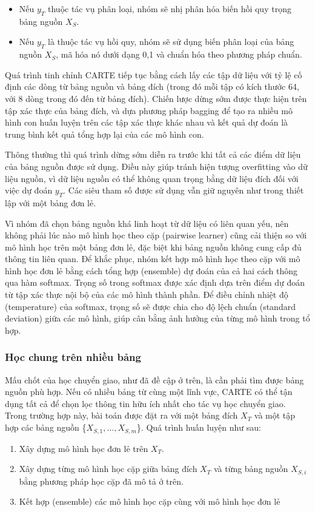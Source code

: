 \documentclass{article}
\begin{document}
\begin{itemize}
    \item Nếu $y_T$ thuộc tác vụ phân loại, nhóm sẽ nhị phân hóa biến hồi quy trọng bảng nguồn $X_S$.
    \item Nếu $y_T$ là thuộc tác vụ hồi quy, nhóm sẽ sử dụng biến phân loại của bảng nguồn $X_S$, mã hóa nó dưới dạng {0,1} và chuẩn hóa theo phương pháp chuẩn.
\end{itemize}

Quá trình tinh chỉnh CARTE tiếp tục bằng cách lấy các tập dữ liệu với tỷ lệ cố định các dòng từ bảng nguồn và bảng đích (trong đó mỗi tập có kích thước 64, với 8 dòng trong đó đến từ bảng đích). Chiến lược dừng sớm được thực hiện trên tập xác thực của bảng đích, và dựa phương pháp bagging để tạo ra nhiều mô hình con huấn luyện trên các tập xác thực khác nhau và kết quả dự đoán là trung bình kết quả tổng hợp lại của các mô hình con.

Thông thường thì quá trình dừng sớm diễn ra trước khi tất cả các điểm dữ liệu của bảng nguồn được sử dụng. Điều này giúp tránh hiện tượng overfitting vào dữ liệu nguồn, vì dữ liệu nguồn có thể không quan trọng bằng dữ liệu đích đối với việc dự đoán $y_T$. Các siêu tham số được sử dụng vẫn giữ nguyên như trong thiết lập với một bảng đơn lẻ.

Vì nhóm đã chọn bảng nguồn khá linh hoạt từ dữ liệu có liên quan yếu, nên không phải lúc nào mô hình học theo cặp (pairwise learner) cũng cải thiện so với mô hình học trên một bảng đơn lẻ, đặc biệt khi bảng nguồn không cung cấp đủ thông tin liên quan. Để khắc phục, nhóm kết hợp mô hình học theo cặp với mô hình học đơn lẻ bằng cách tổng hợp (ensemble) dự đoán của cả hai cách thông qua hàm softmax. Trọng số trong softmax được xác định dựa trên điểm dự đoán từ tập xác thực nội bộ của các mô hình thành phần. Để điều chỉnh nhiệt độ (temperature) của softmax, trọng số sẽ được chia cho độ lệch chuẩn (standard deviation) giữa các mô hình, giúp cân bằng ảnh hưởng của từng mô hình trong tổ hợp.

\subsubsection{Học chung trên nhiều bảng}
Mấu chốt của học chuyển giao, như đã đề cập ở trên, là cần phải tìm được bảng nguồn phù hợp. Nếu có nhiều bảng từ cùng một lĩnh vực, CARTE có thể tận dụng tất cả để chọn lọc thông tin hữu ích nhất cho tác vụ học chuyển giao. Trong trường hợp này, bài toán được đặt ra với một bảng đích $X_T$ và một tập hợp các bảng nguồn \{$X_{S,1}, ..., X_{S,m}$\}. Quá trình huấn luyện như sau:
\begin{enumerate}
    \item Xây dựng mô hình học đơn lẻ trên $X_T$.
    \item Xây dựng từng mô hình học cặp giữa bảng đích $X_T$ và từng bảng nguồn $X_{S,i}$ bằng phương pháp học cặp đã mô tả ở trên.
    \item Kết hợp (ensemble) các mô hình học cặp cùng với mô hình học đơn lẻ
\end{enumerate}
\end{document}
